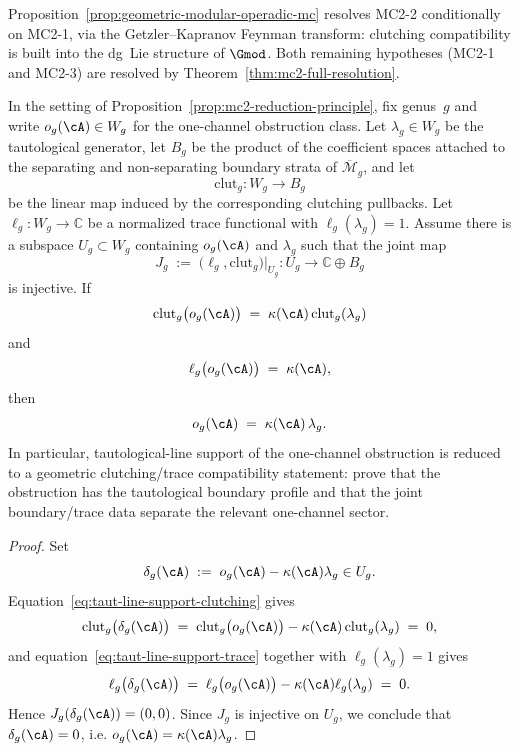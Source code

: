 \begin{remark}
\label{rem:mc2-2-resolution}
Proposition~\ref{prop:geometric-modular-operadic-mc} resolves
MC2-2 conditionally on MC2-1, via the Getzler--Kapranov Feynman
transform: clutching compatibility is built into the dg~Lie
structure of $\Gmod$.  Both remaining hypotheses (MC2-1 and MC2-3)
are resolved by Theorem~\ref{thm:mc2-full-resolution}.
\end{remark}

\begin{proposition}\label{prop:tautological-line-support-criterion}
In the setting of
Proposition~\textup{\ref{prop:mc2-reduction-principle}}, fix genus~$g$
and write $o_g(\cA)\in W_g$ for the one-channel obstruction class.
Let $\lambda_g\in W_g$ be the tautological generator, let
$B_g$ be the product of the coefficient spaces attached to the
separating and non-separating boundary strata of
$\overline{\mathcal{M}}_g$, and let
\[
\mathrm{clut}_g\colon W_g \longrightarrow B_g
\]
be the linear map induced by the corresponding clutching pullbacks.
Let $\ell_g\colon W_g\to\mathbb{C}$ be a normalized trace functional
with $\ell_g(\lambda_g)=1$.
Assume there is a subspace $U_g\subset W_g$ containing
$o_g(\cA)$ and $\lambda_g$ such that the joint map
\[
J_g
\;:=\;
\bigl(\ell_g,\mathrm{clut}_g\bigr)\big|_{U_g}
\colon U_g \longrightarrow \mathbb{C}\oplus B_g
\]
is injective.
If
\begin{equation}\label{eq:taut-line-support-clutching}
\mathrm{clut}_g\bigl(o_g(\cA)\bigr)
\;=\;
\kappa(\cA)\,\mathrm{clut}_g(\lambda_g)
\end{equation}
and
\begin{equation}\label{eq:taut-line-support-trace}
\ell_g\bigl(o_g(\cA)\bigr)
\;=\;
\kappa(\cA),
\end{equation}
then
\[
o_g(\cA) \;=\; \kappa(\cA)\,\lambda_g.
\]
In particular, tautological-line support of the one-channel
obstruction is reduced to a geometric clutching/trace compatibility
statement: prove that the obstruction has the tautological boundary
profile and that the joint boundary/trace data separate the relevant
one-channel sector.
\end{proposition}

\begin{proof}
Set
\[
\delta_g(\cA)
\;:=\;
o_g(\cA)-\kappa(\cA)\lambda_g \in U_g.
\]
Equation~\eqref{eq:taut-line-support-clutching} gives
\[
\mathrm{clut}_g\bigl(\delta_g(\cA)\bigr)
\;=\;
\mathrm{clut}_g\bigl(o_g(\cA)\bigr)
- \kappa(\cA)\,\mathrm{clut}_g(\lambda_g)
\;=\; 0,
\]
and equation~\eqref{eq:taut-line-support-trace} together with
$\ell_g(\lambda_g)=1$ gives
\[
\ell_g\bigl(\delta_g(\cA)\bigr)
\;=\;
\ell_g\bigl(o_g(\cA)\bigr)-\kappa(\cA)\ell_g(\lambda_g)
\;=\; 0.
\]
Hence $J_g(\delta_g(\cA))=(0,0)$.  Since $J_g$ is injective on $U_g$,
we conclude that $\delta_g(\cA)=0$, i.e.
$o_g(\cA)=\kappa(\cA)\lambda_g$.
\end{proof}

